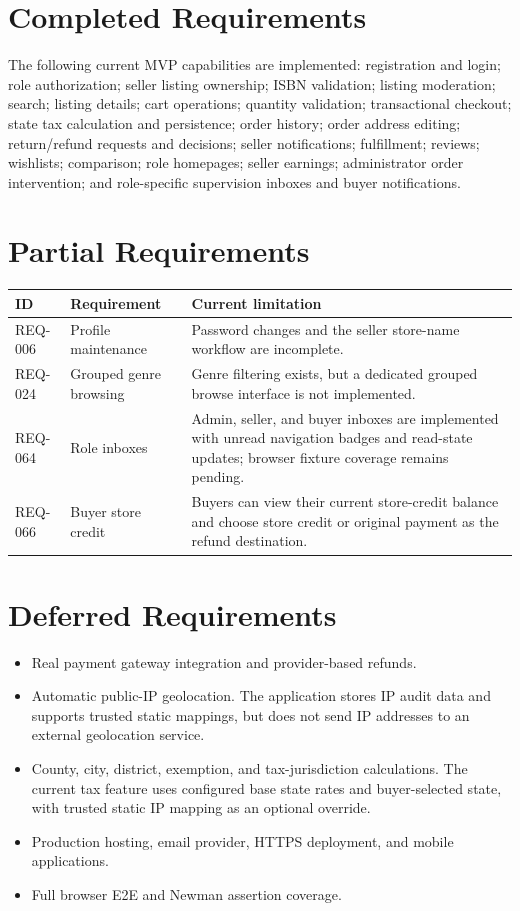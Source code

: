 \documentclass[11pt]{scrreprt}
\begin{document}
\section{Completed Requirements}
The following current MVP capabilities are implemented: registration and login;
role authorization; seller listing ownership; ISBN validation; listing
moderation; search; listing details; cart operations; quantity validation;
transactional checkout; state tax calculation and persistence; order history;
order address editing; return/refund requests and decisions; seller
notifications; fulfillment; reviews; wishlists; comparison;
role homepages; seller earnings; administrator order intervention; and
role-specific supervision inboxes and buyer notifications.

\section{Partial Requirements}
\begin{longtable}{p{1.2cm}p{5.2cm}p{7.1cm}}
\toprule
\textbf{ID} & \textbf{Requirement} & \textbf{Current limitation}\\
\midrule
REQ-006 & Profile maintenance & Password changes and the seller store-name workflow are incomplete.\\
REQ-024 & Grouped genre browsing & Genre filtering exists, but a dedicated grouped browse interface is not implemented.\\
REQ-064 & Role inboxes & Admin, seller, and buyer inboxes are implemented with unread navigation badges and read-state updates; browser fixture coverage remains pending.\\
REQ-066 & Buyer store credit & Buyers can view their current store-credit balance and choose store credit or original payment as the refund destination.\\
\bottomrule
\end{longtable}

\section{Deferred Requirements}
\begin{itemize}
\item Real payment gateway integration and provider-based refunds.
\item Automatic public-IP geolocation. The application stores IP audit data and
supports trusted static mappings, but does not send IP addresses to an
external geolocation service.
\item County, city, district, exemption, and tax-jurisdiction calculations.
The current tax feature uses configured base state rates and buyer-selected
state, with trusted static IP mapping as an optional override.
\item Production hosting, email provider, HTTPS deployment, and mobile
applications.
\item Full browser E2E and Newman assertion coverage.
\end{itemize}
\end{document}
